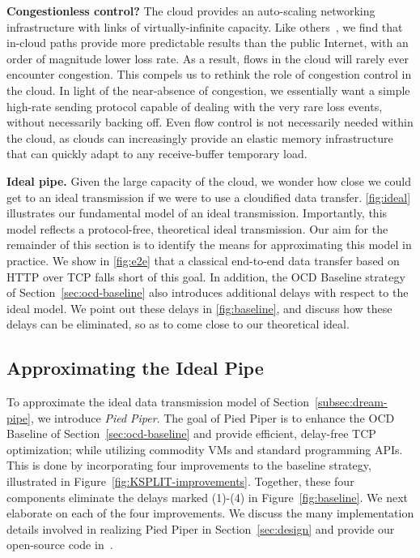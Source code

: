 \documentclass[newfonts=false,format=sigconf,10pt,letterpaper]{acmart}
\newcommand{\T}[1]{\smallskip\noindent\textbf{#1}} %
\newcommand{\oursys}{Pied Piper\xspace}
\begin{document}
\T{Congestionless control?} The cloud provides an auto-scaling networking infrastructure with links of virtually-infinite capacity. Like others~\cite{haq2017measuring}, we find that in-cloud paths provide more predictable results than the public Internet, with an order of magnitude lower loss rate. As a result, flows in the cloud will rarely ever encounter congestion. This compels us to rethink the role of congestion control in the cloud. In light of the near-absence of congestion, we essentially want a simple high-rate sending protocol capable of dealing with the very rare loss events, without necessarily backing off. Even flow control is not necessarily needed within the cloud, as clouds can increasingly provide an elastic memory infrastructure~\cite{hotadd,baloon} that can quickly adapt to any receive-buffer temporary load. 

\T{Ideal pipe.} Given the large capacity of the cloud, we wonder how close we could get to an ideal transmission if we were to use a cloudified data transfer.
\autoref{fig:ideal} illustrates our fundamental model of an ideal transmission. Importantly, this model reflects a protocol-free, theoretical ideal transmission. Our aim for the remainder of this section is to identify the means for approximating this model in practice. We show in \autoref{fig:e2e} that a classical end-to-end data transfer based on HTTP over TCP falls short 
of this goal. In addition, the OCD Baseline strategy of Section~\ref{sec:ocd-baseline} also introduces additional delays with respect to the ideal model. We point out these delays in \autoref{fig:baseline}, and discuss how these delays can be eliminated, so as to come close to our theoretical ideal.

\subsection{Approximating the Ideal Pipe}\label{sec:approx}

To approximate the ideal data transmission model of Section~\ref{subsec:dream-pipe}, we introduce \textit{\oursys}.
The goal of \oursys is to enhance the OCD Baseline of Section~\ref{sec:ocd-baseline} and provide efficient, delay-free TCP optimization; while utilizing commodity VMs and standard programming APIs. This is done by incorporating four improvements to the baseline strategy, illustrated in Figure~\ref{fig:KSPLIT-improvements}. Together, these four components eliminate the delays marked (1)-(4) in Figure~\ref{fig:baseline}. We next elaborate on each of the four improvements. We discuss the many implementation details involved in realizing \oursys in Section~\ref{sec:design} and provide our open-source code in~\cite{ktcp}.
\end{document}
